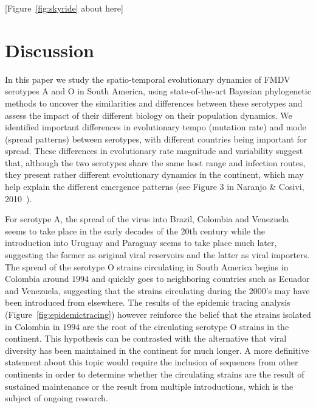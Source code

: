 \documentclass[10pt]{article}
\begin{document}
\begin{center}
 [Figure~\ref{fig:skyride} about here]
\end{center}


\section*{Discussion}

In this paper we study the spatio-temporal evolutionary dynamics of FMDV serotypes A and O in South America, using state-of-the-art Bayesian phylogenetic methods to uncover the similarities and differences between these serotypes and assess the impact of their different biology on their population dynamics.
We identified important differences in evolutionary tempo (mutation rate) and mode (spread patterns) between serotypes, with different countries being important for spread.
These differences in evolutionary rate magnitude and variability suggest that, although the two serotypes share the same host range and infection routes, they present rather different evolutionary dynamics in the continent, which may help explain the different emergence patterns (see Figure 3 in Naranjo \& Cosivi, 2010~\cite{Naranjo2013}). 

For serotype A, the spread of the virus into  Brazil, Colombia and Venezuela seems to take place in the early decades of the 20th century while the introduction into Uruguay and Paraguay seems to take place much later, suggesting the former as original viral reservoirs and the latter as viral importers.
The spread of the serotype O strains  circulating in South America begins in Colombia around $1994$ and quickly goes to neighboring countries such as Ecuador and Venezuela, suggesting that the strains circulating during the $2000$'s may have been introduced from elsewhere.
The results of the epidemic tracing analysis (Figure~\ref{fig:epidemictracing}) however reinforce the belief that the strains isolated in Colombia in $1994$ are the root of the circulating serotype O strains in the continent.
This hypothesis can be contrasted with the alternative that viral diversity has been maintained in the continent for much longer. 
A more definitive statement about this topic would require the inclusion of sequences from other continents in order to determine whether the circulating strains are the result of sustained maintenance or the result from multiple introductions, which is the subject of ongoing research.
\end{document}
